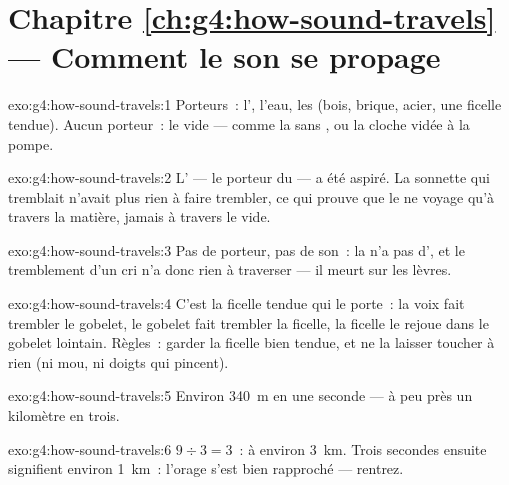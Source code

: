 \section*{Chapitre \ref{ch:g4:how-sound-travels} --- Comment le son se propage}

\begin{solution}{exo:g4:how-sound-travels:1}
Porteurs~: l', l'eau, les  (bois, brique, acier, une
ficelle tendue). Aucun porteur~: le vide --- comme la  sans ,
ou la cloche vidée à la pompe.
\end{solution}

\begin{solution}{exo:g4:how-sound-travels:2}
L' --- le porteur du  --- a été aspiré. La sonnette qui
tremblait n'avait plus rien à faire trembler, ce qui prouve que le
 ne voyage qu'à travers la matière, jamais à travers le vide.
\end{solution}

\begin{solution}{exo:g4:how-sound-travels:3}
Pas de porteur, pas de son~: la  n'a pas d', et le tremblement
d'un cri n'a donc rien à traverser --- il meurt sur les lèvres.
\end{solution}

\begin{solution}{exo:g4:how-sound-travels:4}
C'est la ficelle tendue qui le porte~: la voix fait trembler le
gobelet, le gobelet fait trembler la ficelle, la ficelle le rejoue
dans le gobelet lointain. Règles~: garder la ficelle bien tendue, et
ne la laisser toucher à rien (ni mou, ni doigts qui pincent).
\end{solution}

\begin{solution}{exo:g4:how-sound-travels:5}
Environ \qty{340}{m} en une seconde --- à peu près un kilomètre en
trois.
\end{solution}

\begin{solution}{exo:g4:how-sound-travels:6}
$9 \div 3 = 3$~: à environ \qty{3}{km}. Trois secondes ensuite
signifient environ \qty{1}{km}~: l'orage s'est bien rapproché ---
rentrez.
\end{solution}

